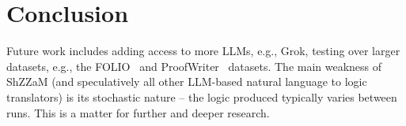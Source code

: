 \documentclass[letterpaper]{article}
\begin{document}

\section{Conclusion}

Future work includes adding access to more LLMs, e.g., Grok, testing over larger datasets, e.g., 
the FOLIO~\cite{HS+24} and ProofWriter~\cite{TDC21} datasets.
The main weakness of ShZZaM (and speculatively all other LLM-based natural language to logic 
translators) is its stochastic nature -- the logic produced typically varies between runs.
This is a matter for further and deeper research.



\end{document}
